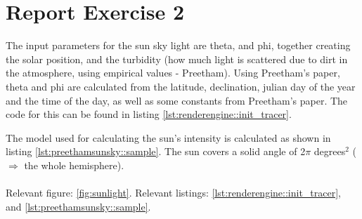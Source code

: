  \section{Report Exercise 2}

The input parameters for the sun sky light are theta, and phi, together creating the solar position, and the turbidity (how much light is scattered due to dirt in the atmosphere, using empirical values - Preetham). Using Preetham's paper, theta and phi are calculated from the latitude, declination, julian day of the year and the time of the day, as well as some constants from Preetham's paper. The code for this can be found in listing \ref{lst:renderengine::init_tracer}.

The model used for calculating the sun's intensity is calculated as shown in listing \ref{lst:preethamsunsky::sample}. The sun covers a solid angle of 2$\pi$ degrees$^2$ ($\Rightarrow$ the whole hemisphere).
\\
\\
Relevant figure: \ref{fig:sunlight}. Relevant listings: \ref{lst:renderengine::init_tracer}, and \ref{lst:preethamsunsky::sample}.

